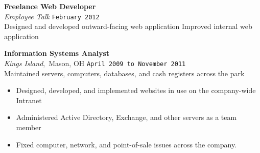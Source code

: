 \documentclass[11pt, line]{res}
\begin{document}
\begin{resume}
			\vspace{-4pt}
				\textbf{Freelance Web Developer} \\
				\textit{Employee Talk}
					\hfill \texttt{February 2012} \\
				Designed and developed outward-facing web application
				Improved internal web application

			\vspace{-4pt}
				\textbf{Information Systems Analyst} \\
				\textit{Kings Island},\, Mason, OH
					\hfill \texttt{April 2009 to November 2011} \\
				Maintained servers, computers, databases, and cash registers across the park

				\begin{itemize}
					\item Designed, developed, and implemented websites in use on the company-wide Intranet
					\item Administered Active Directory, Exchange, and other servers as a team member
					\item Fixed computer, network, and point-of-sale issues across the company.
				\end{itemize}
	\end{resume}
\end{document}

